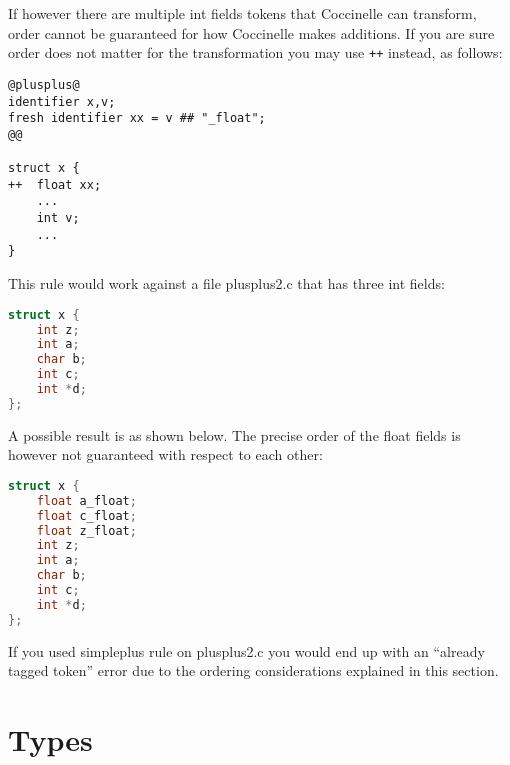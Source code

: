If however there are multiple int fields tokens that Coccinelle
can transform, order cannot be guaranteed for how Coccinelle
makes additions. If you are sure order does not matter for
the transformation you may use \texttt{++} instead, as follows:

\begin{lstlisting}[language=Cocci]
@plusplus@
identifier x,v;
fresh identifier xx = v ## "_float";
@@

struct x {
++	float xx;
	...
	int v;
	...
}
\end{lstlisting}

This rule would work against a file plusplus2.c that has three
int fields:

\begin{lstlisting}[language=C]
struct x {
	int z;
	int a;
	char b;
	int c;
	int *d;
};
\end{lstlisting}

A possible result is as shown below. The precise order of the float fields
is however not guaranteed with respect to each other:

\begin{lstlisting}[language=C]
struct x {
	float a_float;
	float c_float;
	float z_float;
	int z;
	int a;
	char b;
	int c;
	int *d;
};
\end{lstlisting}

If you used simpleplus rule on plusplus2.c you would end up with
an ``already tagged token'' error due to the ordering considerations
explained in this section.

\section{Types}
\label{types}

